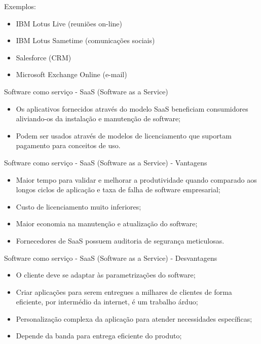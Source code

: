 \documentclass{beamer}
\begin{document}
\begin{frame}[fragile]{Exemplos:}\justifying
      \begin{itemize}
            \item IBM Lotus Live (reuniões on-line)
            \item IBM Lotus Sametime (comunicações sociais)
            \item Salesforce (CRM)
            \item Microsoft Exchange Online (e-mail)
      \end{itemize}
\end{frame}
\begin{frame}[fragile]{Software como serviço - SaaS (Software as a Service)}\justifying
      \begin{itemize}
            \item Os aplicativos fornecidos através do modelo SaaS beneficiam consumidores aliviando-os da instalação e manutenção de software;
            \item Podem ser usados através de modelos de licenciamento que suportam pagamento para conceitos de uso.
      \end{itemize}
\end{frame}
\begin{frame}[fragile]{Software como serviço - SaaS (Software as a Service) - Vantagens}\justifying
      \begin{itemize}
            \item Maior tempo para validar e melhorar a produtividade quando comparado aos longos ciclos de aplicação e taxa de falha de software empresarial;
            \item Custo de licenciamento muito inferiores;
            \item Maior economia na manutenção e atualização do software;
            \item Fornecedores de SaaS possuem auditoria de segurança meticulosas.
      \end{itemize}
\end{frame}
\begin{frame}[fragile]{Software como serviço - SaaS (Software as a Service) - Desvantagens}\justifying
      \begin{itemize}
            \item O cliente deve se adaptar às parametrizações do software;
            \item Criar aplicações para serem entregues a milhares de clientes de forma eficiente, por intermédio da internet, é um trabalho árduo;
            \item Personalização complexa da aplicação para atender necessidades específicas;
            \item Depende da banda para entrega eficiente do produto;
      \end{itemize}
\end{frame}
\end{document}
